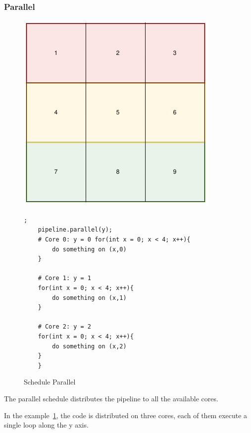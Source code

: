 \subsubsection{Parallel}
\begin{figure}[H]

		\begin{minipage}[c]{\EIW}
			\centering
		\includegraphics[width=\textwidth]{Images/Parallel.png}
		\end{minipage}
		\begin{minipage}[c]{\ECW}
			\centering
			\begin{lstlisting}[label={code:reorder}];
	pipeline.parallel(y);
	# Core 0: y = 0 for(int x = 0; x < 4; x++){
		do something on (x,0)
	}

	# Core 1: y = 1
	for(int x = 0; x < 4; x++){
		do something on (x,1)
	}

	# Core 2: y = 2
	for(int x = 0; x < 4; x++){
		do something on (x,2)
	}
	}
\end{lstlisting}
		\end{minipage}
		\caption{Schedule Parallel}
		\label{schedule:parallel}
\end{figure}


The parallel schedule distributes the pipeline to all the available cores.

In the example~\ref{schedule:parallel}, the code is distributed on three cores, each of them execute a single loop along the y axis.

